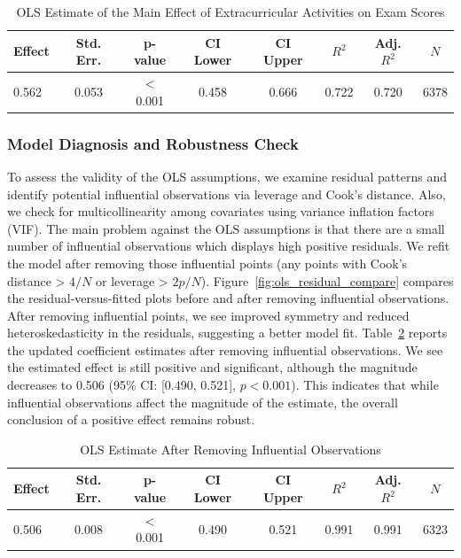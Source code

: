 \documentclass[10pt,letterpaper]{article}
\begin{document}
\begin{table}[htbp]
\centering
\caption{OLS Estimate of the Main Effect of Extracurricular Activities on Exam Scores}
\label{tab:ols-main}
\begin{tabular}{lccccccc}
\toprule
Effect & Std. Err. & p-value & CI Lower & CI Upper & $R^2$ & Adj. $R^2$ & $N$ \\
\midrule
0.562 & 0.053 & $<$0.001 & 0.458 & 0.666 & 0.722 & 0.720 & 6378 \\
\bottomrule
\end{tabular}
\end{table}

\subsubsection{Model Diagnosis and Robustness Check }

To assess the validity of the OLS assumptions, we examine residual patterns and identify potential influential observations via leverage and Cook's distance. Also, we check for multicollinearity among covariates using variance inflation factors (VIF). The main problem against the OLS assumptions is that there are a small number of influential observations which displays high positive residuals. We refit the model after removing those influential points (any points with Cook's distance > $4/N$ or leverage > $2p/N$). Figure~\ref{fig:ols_residual_compare} compares the residual-versus-fitted plots before and after removing influential observations. After removing influential points, we see improved symmetry and reduced heteroskedasticity in the residuals, suggesting a better model fit. Table~\ref{tab:ols-no-influential} reports the updated coefficient estimates after removing influential observations. We see the estimated effect is still positive and significant, although the magnitude decreases to 0.506 (95\% CI: [0.490, 0.521], $p < 0.001$). This indicates that while influential observations affect the magnitude of the estimate, the overall conclusion of a positive effect remains robust. 

\begin{table}[htbp]
\centering
\caption{OLS Estimate After Removing Influential Observations}
\label{tab:ols-no-influential}
\begin{tabular}{lccccccc}
\toprule
Effect & Std. Err. & p-value & CI Lower & CI Upper & $R^2$ & Adj. $R^2$ & $N$ \\
\midrule
0.506 & 0.008 & $<$0.001 & 0.490 & 0.521 & 0.991 & 0.991 & 6323 \\
\bottomrule
\end{tabular}
\end{table}
\end{document}
